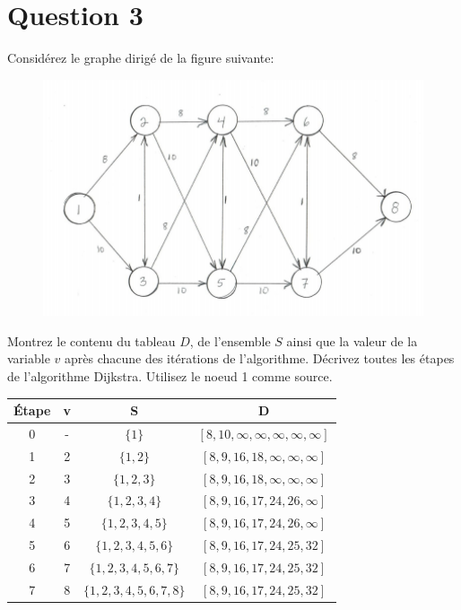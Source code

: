 \documentclass[12pt]{article}
\begin{document}
\section*{Question 3}
Considérez le graphe dirigé de la figure suivante:

\begin{figure}[H]
	\centering
	\includegraphics[width=12cm]{q3}
\end{figure}

Montrez le contenu du tableau \(D\), de l’ensemble \(S\) ainsi que la valeur de la variable \(v\) après chacune des itérations de l’algorithme. Décrivez toutes les étapes de l’algorithme Dijkstra. Utilisez le noeud 1 comme source. \\

\begin{table}[H]
\centering
\begin{tabular}{c|ccc}
Étape     & v & S                                  & D \\ \hline
    0     & - &  \(\lbrace 1 \rbrace\)   & \([8,10,\infty,\infty,\infty,\infty,\infty]\)  \\
    1     & 2 &  \(\lbrace 1,2 \rbrace\)     & \([8,9,16,18,\infty,\infty,\infty]\)  \\
    2     & 3 &  \(\lbrace 1,2,3 \rbrace\)       & \([8,9,16,18,\infty,\infty,\infty]\)  \\ 
    3     & 4 &  \(\lbrace 1,2,3,4 \rbrace\)         & \([8,9,16,17,24,26,\infty]\)  \\
    4     & 5 &  \(\lbrace 1,2,3,4,5 \rbrace\)           & \([8,9,16,17,24,26,\infty]\)  \\
    5     & 6 &  \(\lbrace 1,2,3,4,5,6 \rbrace\)   		     & \([8,9,16,17,24,25,32]\)  \\
    6     & 7 &  \(\lbrace 1,2,3,4,5,6,7 \rbrace\)   			 & \([8,9,16,17,24,25,32]\)  \\
    7     & 8 &  \(\lbrace 1,2,3,4,5,6,7,8 \rbrace\)   			 & \([8,9,16,17,24,25,32]\)  \\
\end{tabular}
\end{table}
\end{document}
